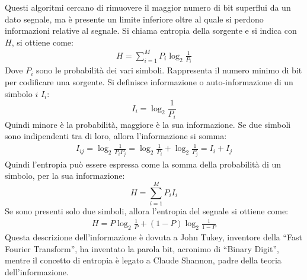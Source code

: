 \documentclass{article}
\numberwithin{equation}{subsection}
\begin{document}
Questi algoritmi cercano di rimuovere il maggior numero di bit superflui da un dato segnale, ma è presente un limite inferiore oltre al quale si perdono informazioni 
relative al segnale. 
Si chiama entropia della sorgente e si indica con $H$, si ottiene come:
\begin{gather*}
    H=\displaystyle\sum_{i=1}^MP_i\log_2\frac{1}{P_i}
\end{gather*}
Dove $P_i$ sono le probabilità dei vari simboli. Rappresenta il numero minimo di bit per codificare una sorgente. 
Si definisce informazione o auto-informazione di un simbolo $i$ $I_i$:
\begin{equation}
    I_i=\log_2\displaystyle\frac{1}{P_i}
\end{equation}
Quindi minore è la probabilità, maggiore è la sua informazione. Se due simboli sono indipendenti tra di loro, allora l'informazione si somma:
\begin{gather*}
    I_{ij}=\log_2\displaystyle\frac{1}{P_iP_j}=\log_2\displaystyle\frac{1}{P_i}+\log_2\displaystyle\frac{1}{P_j}=I_i+I_j
\end{gather*}
Quindi l'entropia può essere espressa come la somma della probabilità di un simbolo, per la sua informazione:
\begin{equation}
    H=\displaystyle\sum_{i=1}^MP_iI_i
\end{equation}
Se sono presenti solo due simboli, allora l'entropia del segnale si ottiene come:
\begin{gather*}
    H=P\log_2\displaystyle\frac{1}{P}+(1-P)\log_2\frac{1}{1-P}
\end{gather*}
Questa descrizione dell'informazione è dovuta a John Tukey, inventore della ``Fast Fourier Transform'', ha inventato la parola bit, acronimo di ``Binary Digit'', 
mentre il concetto di entropia è legato a Claude Shannon, padre della teoria dell'informazione. 
\end{document}
